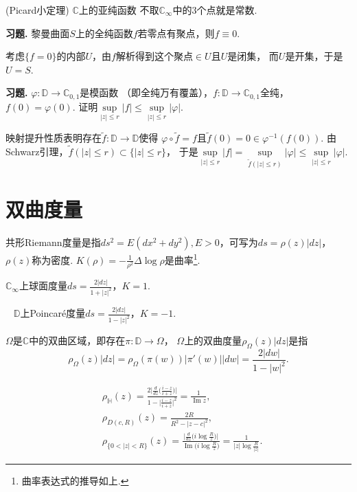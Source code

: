 \begin{proposition}(Picard小定理) $\mathbb{C}$上的亚纯函数
不取$\mathbb{C}_\infty$中的$3$个点就是常数.\end{proposition}

\textbf{习题. } 黎曼曲面$S$上的全纯函数$f$若零点有聚点，则$f\equiv0$.
\begin{proofc}
    考虑$\{f=0\}$的内部$U$，由$f$解析得到这个聚点$\in U$且$U$是闭集，
    而$U$是开集，于是$U=S$.
\end{proofc}

\textbf{习题. } $\varphi\colon\mathbb{D}\rightarrow\mathbb{C}_{0,1}$是模函数
（即全纯万有覆盖），$f\colon\mathbb{D}\rightarrow\mathbb{C}_{0,1}$全纯，$f(0)=\varphi(0)$. 
证明$\sup\limits_{|z|\leq r}|f|\leq\sup\limits_{|z|\leq r}|\varphi|$.
\begin{proofc}
    映射提升性质表明存在$\tilde{f}\colon\mathbb{D}\rightarrow\mathbb{D}$使得
    $\varphi\circ\tilde{f}=f$且$\tilde{f}(0)=0\in\varphi^{-1}(f(0))$.
    由Schwarz引理，$\tilde{f}(|z|\leq r)\subset\{|z|\leq r\}$，
    于是$\sup\limits_{|z|\leq r}|f|=\sup\limits_{\tilde{f}(|z|\leq r)}|\varphi|
    \leq\sup\limits_{|z|\leq r}|\varphi|$.
\end{proofc}

\section{双曲度量}

\begin{definition}共形Riemann度量是指$ds^2=E(dx^2+dy^2),E>0$，可写为$ds=\rho(z)|dz|$，$\rho(z)$称为密度.
$K(\rho)=-\frac{1}{\rho^2}\Delta\log\rho$是曲率\footnote{曲率表达式的推导如上.}.\end{definition}

\begin{example}$\mathbb{C}_\infty$上球面度量$\displaystyle{ds=\frac{2|dz|}{1+|z|^2}}$，$K=1$.

\quad\ \,\,$\mathbb{D}$上Poincaré度量$\displaystyle{ds=\frac{2|dz|}{1-|z|^2}}$，$K=-1$.\end{example}

\begin{definition}$\Omega$是$\mathbb{C}$中的双曲区域，即存在$\pi\colon\mathbb{D}\rightarrow\Omega$，
$\Omega$上的双曲度量$\rho_\Omega(z)|dz|$是指$$\rho_\Omega(z)|dz|
=\rho_\Omega(\pi(w))|\pi'(w)||dw|=\frac{2|dw|}{1-|w|^2}.$$\end{definition}

\begin{example}\begin{align*}&\rho_{\mathbb{H}}(z)
=\frac{2\big|\frac{d}{dz}\big(\frac{i-z}{i+z}\big)\big|}{1-\big|\frac{i-z}{i+z}\big|^2}
=\frac{1}{\operatorname{Im}z},\\
&\rho_{D(c,R)}(z)=\frac{2R}{R^2-|z-c|^2},\\
&\rho_{\{0<|z|<R\}}(z)
=\frac{\big|\frac{d}{dz}\big(i\log\frac{R}{z}\big)\big|}{\operatorname{Im}\big(i\log\frac{R}{z}\big)}
=\frac{1}{|z|\log\frac{R}{|z|}}.\end{align*}\end{example}

